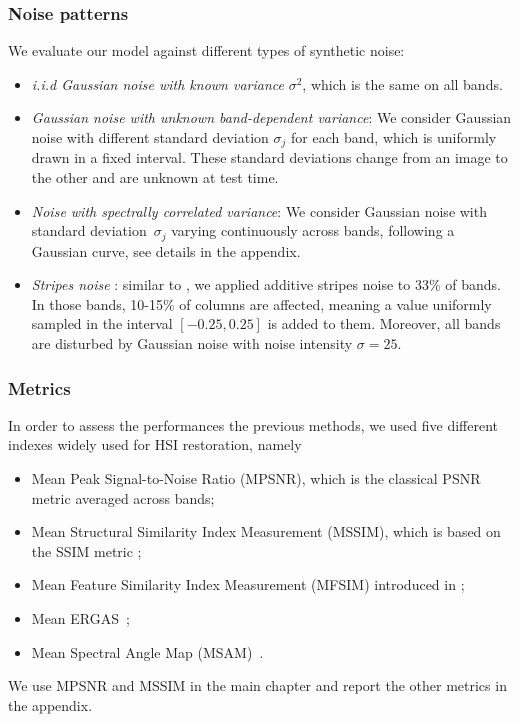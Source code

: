 \subsubsection{Noise patterns}

We evaluate our model against different types of synthetic noise:
\begin{itemize}
	\item \textit{i.i.d Gaussian noise with known variance} $\sigma^2$, which is the same on all bands.
	\item \textit{Gaussian noise with unknown band-dependent variance}: We consider Gaussian noise with different standard deviation $\sigma_j$ for each band, which is uniformly drawn in a fixed interval. These standard deviations change from an image to the other and are unknown at test time.
	\item \textit{Noise with spectrally correlated variance}: We consider Gaussian noise with standard deviation~$\sigma_j$ varying continuously across bands, following a Gaussian curve, see details in the appendix.
	\item \textit{Stripes noise} : similar to \cite{wei_3-d_2020}, we applied additive stripes noise to 33\% of bands.
	      In those bands, 10-15\% of columns are affected, meaning a value uniformly sampled in the interval $[-0.25, 0.25]$ is added to them.
	      Moreover, all bands are disturbed by Gaussian noise with noise intensity $\sigma=25$.
\end{itemize}


\subsubsection{Metrics}

In order to assess the performances the previous methods, we used five different indexes widely used for HSI restoration, namely
\begin{itemize}
    \item Mean Peak Signal-to-Noise Ratio (MPSNR), which is the classical PSNR metric averaged across bands;
    \item Mean Structural Similarity Index Measurement (MSSIM), which is based on the SSIM metric \cite{wang_image_2004}; 
    \item Mean Feature Similarity Index Measurement (MFSIM) introduced in \cite{zhang_fsim_2011};
    \item Mean ERGAS~\cite{du_performance_2007};
    \item Mean Spectral Angle Map (MSAM)~\cite{alparone_comparison_2007}.
\end{itemize}
We use MPSNR and MSSIM in the main chapter and report the other metrics in the appendix.


